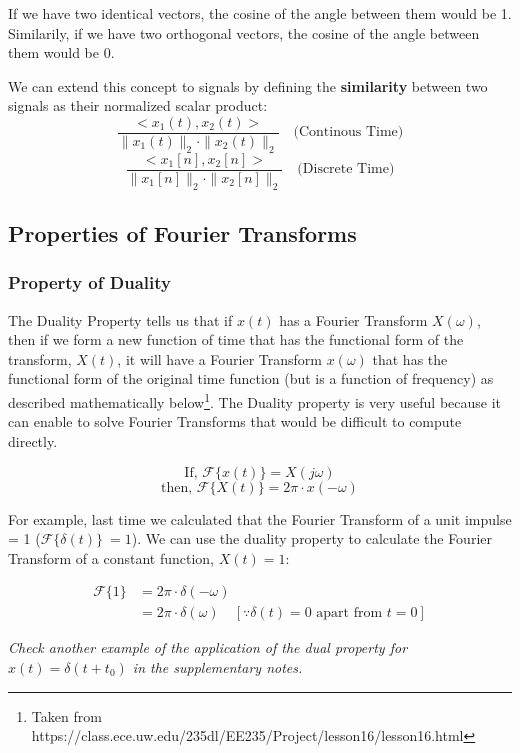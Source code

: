 \documentclass[letterpaper,12pt]{article}
\begin{document}
If we have two identical vectors, the cosine of the angle between them would be 1. Similarily, if we have two orthogonal vectors, the cosine of the angle between them would be 0.

We can extend this concept to signals by defining the \textbf{similarity} between two signals as their normalized scalar product:
\[\frac{<x_1(t), x_2(t)>}{\| x_1(t) \|_2 \cdot \| x_2(t) \|_2}\quad \text{(Continous Time)}\]
\[\frac{<x_1[n], x_2[n]>}{\| x_1[n] \|_2 \cdot \| x_2[n] \|_2}\quad \text{(Discrete Time)}\]

\newpage
\subsection*{Properties of Fourier Transforms}
\subsubsection*{Property of Duality}

The Duality Property tells us that if $x(t)$ has a Fourier Transform $X(\omega)$, then if we form a new function of time that has the functional form of the transform, $X(t)$, it will have a Fourier Transform $x(\omega)$ that has the functional form of the original time function (but is a function of frequency) as described mathematically below\footnote{Taken from https://class.ece.uw.edu/235dl/EE235/Project/lesson16/lesson16.html}. The Duality property is very useful because it can enable to solve Fourier Transforms that would be difficult to compute directly.

\[ \text{If, } \mathcal{F}\{x(t)\} = X(j\omega)\]
\[ \text{then, } \mathcal{F}\{X(t)\} = 2\pi\cdot x(-\omega)\]

For example, last time we calculated that the Fourier Transform of a unit impulse = 1 ($\mathcal{F}\{\delta(t)\}\ = 1$). We can use the duality property to calculate the Fourier Transform of a constant function, $X(t) = 1$:

\begin{equation*}
    \begin{aligned}
        \mathcal{F}\{1\} & = 2\pi\cdot\delta(-\omega)                                                         \\
                         & = 2\pi\cdot\delta(\omega) \quad [\text{$\because \delta(t) = 0$ apart from $t=0$}]
    \end{aligned}
\end{equation*}

\textit{Check another example of the application of the dual property for $x(t) = \delta(t + t_{0})$ in the supplementary notes.}
\end{document}

